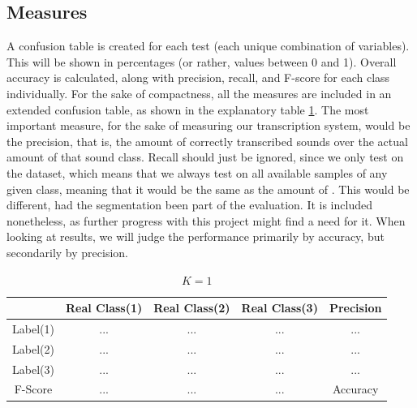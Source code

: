 	\subsection{Measures}
		A confusion table is created for each test (each unique combination of variables). This will be shown in percentages (or rather, values between 0 and 1). Overall accuracy is calculated, along with precision, recall, and F-score for each class individually. For the sake of compactness, all the measures are included in an extended confusion table, as shown in the explanatory table \ref{table:eval:explanatory}. 
		The most important measure, for the sake of measuring our transcription system, would be the precision, that is, the amount of correctly transcribed sounds over the actual amount of that sound class.
		Recall should just be ignored, since we only test on the dataset, which means that we always test on all available samples of any given class, meaning that it would be the same as the amount of . This would be different, had the segmentation been part of the evaluation. It is included nonetheless, as further progress with this project might find a need for it. When looking at results, we will judge the performance primarily by accuracy, but secondarily by precision.

			\begin{table}
				\centering
				\begin{tabular}{|c | c | c | c | c |}
					\hline
				 & Real Class(1) & Real Class(2) & Real Class(3) & Precision\\ \hline
					Label(1)  & ... & ... & ... & ...\\ \hline
					Label(2)  & ... & ... & ... & ...\\ \hline
					Label(3) & ... & ... & ... & ...\\ \hline
					F-Score & ... & ... & ... & Accuracy \\ \cline{1-4}
				\end{tabular}
				\caption{$K=1$}
				\label{table:eval:explanatory}
			\end{table}
		
		
